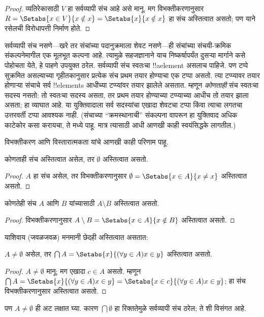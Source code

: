 \documentclass[../../../include/open-logic-section]{subfiles}
\begin{document}
\begin{proof}
व्यतिरेकासाठी $V$ हा सर्वव्यापी संच आहे असे मानू. मग विभक्तीकरणानुसार $R =
\Setabs{x \in V}{x \notin x} = \Setabs{x}{x \notin x}$ हा संच अस्तित्वात असतो; पण याने रसेलची विरोधापत्ती निर्माण होते.
\end{proof}

सर्वव्यापी संच नसणे---खरे तर संचांच्या पदानुक्रमाला शेवट नसणे---ही संचांच्या संचयी-क्रमिक संकल्पनेमागील एक मूलभूत कल्पना आहे. त्यामुळे सहजज्ञानाने याच निष्कर्षापर्यंत दुसऱ्या मार्गाने कसे पोहोचता येते, हे पाहणे उपयुक्त ठरेल. सर्वव्यापी संच स्वतःचा !!a{element} असलाच पाहिजे. पण टप्पे सुक्रमित असल्याच्या गृहीतकानुसार प्रत्येक संच प्रथम तयार होण्याचा एक टप्पा असतो. त्या टप्प्यावर तयार होणाऱ्या संचाचे सर्व !!{element}s आधीच्या टप्प्यांवर तयार झालेले असतात. म्हणून \emph{कोणताही} संच स्वतःचा सदस्य नसतो: तो स्वतःचा सदस्य असता, तर प्रथम तयार होण्याच्या टप्प्याच्या आधीच तो तयार झाला असता; हा व्याघात आहे. या युक्तिवादाला सर्व सदस्यांचा एखादा शेवटचा टप्पा किंवा त्याचा लगतचा उत्तरवर्ती टप्पा आवश्यक नाही. (संचाच्या ``क्रमस्थानाची'' संकल्पना वापरून हा युक्तिवाद अधिक काटेकोर कसा करायचा, ते  मध्ये पाहू. मात्र त्यासाठी आधी आणखी काही स्वयंसिद्धके लागतील.)

विभक्तीकरण आणि विस्तारात्मकता यांचे आणखी काही परिणाम पाहू.

\begin{prop}
कोणताही संच अस्तित्वात असेल, तर $\emptyset$ अस्तित्वात असतो.
\end{prop}

\begin{proof}
$A$ हा संच असेल, तर विभक्तीकरणानुसार $\emptyset = \Setabs{x \in A}{x \neq x}$ अस्तित्वात असतो.
\end{proof}

\begin{prop}
कोणतेही संच $A$ आणि $B$ यांच्यासाठी $A \setminus B$ अस्तित्वात असतो.
\end{prop}

\begin{proof}
विभक्तीकरणानुसार $A \setminus B = \Setabs{x \in A}{x \notin B}$ अस्तित्वात असतो.
\end{proof}

याशिवाय (जवळजवळ) मनमानी छेदही अस्तित्वात असतात:

\begin{prop}
$A \neq \emptyset$ असेल, तर $\bigcap A = \Setabs{x}{(\forall y \in A)x \in y}$ अस्तित्वात असतो.
\end{prop}

\begin{proof}
$A \neq \emptyset$ मानू; मग एखादा $c \in A$ असतो. म्हणून $\bigcap A =
\Setabs{x}{(\forall y \in A)x \in y} = \Setabs{x \in c}{(\forall y \in
A)x \in y}$; हा संच विभक्तीकरणानुसार अस्तित्वात असतो.
\end{proof}

पण $A \neq \emptyset$ ही अट लक्षात घ्या. कारण $\bigcap
\emptyset$ हा रिक्ततेमुळे सर्वव्यापी संच ठरेल; ते  शी विसंगत आहे.
\end{document}
